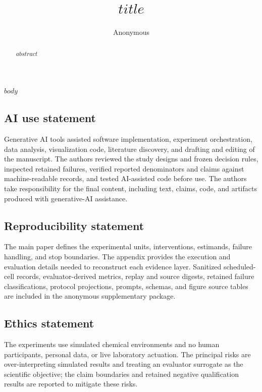 \documentclass{article}
\title{$title$}
\author{Anonymous}
\begin{document}
\maketitle
\raggedbottom

\begin{abstract}
$abstract$
\end{abstract}

$body$

\label{iclr-main-text-end}
\clearpage

\subsection*{AI use statement}
Generative AI tools assisted software implementation, experiment orchestration, data analysis,
visualization code, literature discovery, and drafting and editing of the manuscript. The authors
reviewed the study designs and frozen decision rules, inspected retained failures, verified reported
denominators and claims against machine-readable records, and tested AI-assisted code before use.
The authors take responsibility for the final content, including text, claims, code, and artifacts
produced with generative-AI assistance.

\subsection*{Reproducibility statement}
The main paper defines the experimental units, interventions, estimands, failure handling, and stop
boundaries. The appendix provides the execution and evaluation details needed to reconstruct each
evidence layer. Sanitized scheduled-cell records, evaluator-derived metrics, replay and source
digests, retained failure classifications, protocol projections, prompts, schemas, and figure source
tables are included in the anonymous supplementary package.

\subsection*{Ethics statement}
The experiments use simulated chemical environments and no human participants, personal data, or
live laboratory actuation. The principal risks are over-interpreting simulated results and treating
an evaluator surrogate as the scientific objective; the claim boundaries and retained negative
qualification results are reported to mitigate these risks.




\clearpage
\appendix

\end{document}
